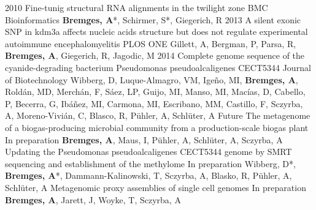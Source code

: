 \documentclass[]{friggeri-cv}
\begin{document}
\begin{entrylist}
\entry
{2010}
{Fine-tunig structural RNA alignments in the twilight zone}
{BMC Bioinformatics}
{\textbf{Bremges, A}*, Schirmer, S*, Giegerich, R}
\entry
{2013}
{A silent exonic SNP in kdm3a affects nucleic acids structure but does not regulate experimental autoimmune encephalomyelitis}
{PLOS ONE}
{Gillett, A, Bergman, P, Parsa, R, \textbf{Bremges, A}, Giegerich, R, Jagodic, M}
\entry
{2014}
{Complete genome sequence of the cyanide-degrading bacterium Pseudomonas pseudoalcaligenes CECT5344}
{Journal of Biotechnology}
{Wibberg, D, Luque-Almagro, VM, Igeño, MI, \textbf{Bremges, A}, Roldán, MD, Merchán, F, Sáez, LP, Guijo, MI, Manso, MI, Macías, D, Cabello, P, Becerra, G, Ibáñez, MI, Carmona, MI, Escribano, MM, Castillo, F, Sczyrba, A, Moreno-Vivián, C, Blasco, R, Pühler, A, Schlüter, A}
\entry
{Future}
{The metagenome of a biogas-producing microbial community from a production-scale biogas plant}
{In preparation}
{\textbf{Bremges, A}, Maus, I, Pühler, A, Schlüter, A, Sczyrba, A}
\entry
{}
{Updating the Pseudomonas pseudoalcaligenes CECT5344 genome by SMRT sequencing and establishment of the methylome}
{In preparation}
{Wibberg, D*, \textbf{Bremges, A}*, Dammann-Kalinowski, T, Sczyrba, A, Blasko, R, Pühler, A, Schlüter, A}
\entry
{}
{Metagenomic proxy assemblies of single cell genomes}
{In preparation}
{\textbf{Bremges, A}, Jarett, J, Woyke, T, Sczyrba, A}
\end{entrylist}
\end{document}
